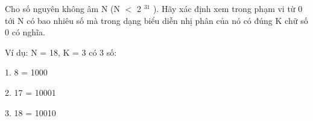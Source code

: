 Cho số nguyên không âm N (N $<$ 2   $^    31   $   ). Hãy xác định xem trong phạm vi từ 0 tới N có bao nhiêu số mà trong dạng biểu diễn nhị phân của nó có đúng K chữ số 0 có nghĩa.  

   Ví dụ: N = 18, K = 3 có 3 số:  

   1. 8 = 1000  

   2. 17 = 10001  

   3. 18 = 10010